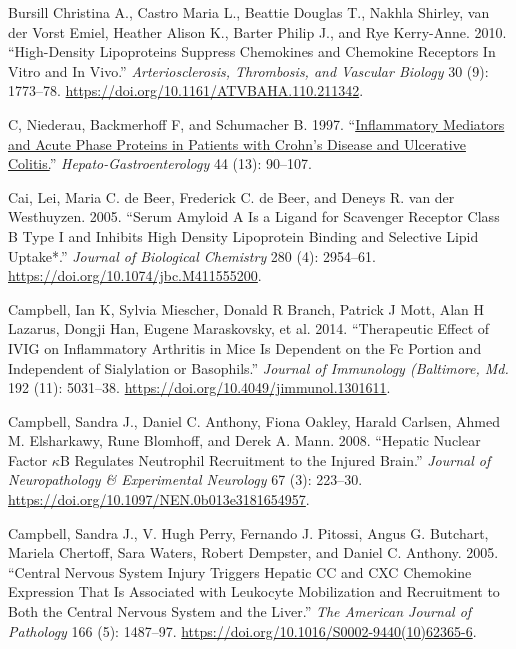 \documentclass[9pt,lineno]{elife}
\newlength{\cslhangindent}
\newlength{\cslentryspacingunit} %
\newenvironment{CSLReferences}[2] %
 {%
  \setlength{\parindent}{0pt}
  \ifodd #1
  \let\oldpar\par
  \def\par{\hangindent=\cslhangindent\oldpar}
  \fi
  \setlength{\parskip}{#2\cslentryspacingunit}
 }%
 {}
\begin{document}
\begin{CSLReferences}{1}{0}
\leavevmode{}%
Bursill Christina A., Castro Maria L., Beattie Douglas T., Nakhla Shirley, van der Vorst Emiel, Heather Alison K., Barter Philip J., and Rye Kerry-Anne. 2010. {``High-{Density Lipoproteins Suppress Chemokines} and {Chemokine Receptors In Vitro} and {In Vivo}.''} \emph{Arteriosclerosis, Thrombosis, and Vascular Biology} 30 (9): 1773--78. \url{https://doi.org/10.1161/ATVBAHA.110.211342}.

\leavevmode{}%
C, Niederau, Backmerhoff F, and Schumacher B. 1997. {``\href{https://www.ncbi.nlm.nih.gov/pubmed/9058126}{Inflammatory Mediators and Acute Phase Proteins in Patients with {Crohn}'s Disease and Ulcerative Colitis.}''} \emph{Hepato-Gastroenterology} 44 (13): 90--107.

\leavevmode{}%
Cai, Lei, Maria C. de Beer, Frederick C. de Beer, and Deneys R. van der Westhuyzen. 2005. {``Serum {Amyloid A Is} a {Ligand} for {Scavenger Receptor Class B Type I} and {Inhibits High Density Lipoprotein Binding} and {Selective Lipid Uptake}*.''} \emph{Journal of Biological Chemistry} 280 (4): 2954--61. \url{https://doi.org/10.1074/jbc.M411555200}.

\leavevmode{}%
Campbell, Ian K, Sylvia Miescher, Donald R Branch, Patrick J Mott, Alan H Lazarus, Dongji Han, Eugene Maraskovsky, et al. 2014. {``Therapeutic Effect of {IVIG} on Inflammatory Arthritis in Mice Is Dependent on the {Fc} Portion and Independent of Sialylation or Basophils.''} \emph{Journal of Immunology (Baltimore, Md.} 192 (11): 5031--38. \url{https://doi.org/10.4049/jimmunol.1301611}.

\leavevmode{}%
Campbell, Sandra J., Daniel C. Anthony, Fiona Oakley, Harald Carlsen, Ahmed M. Elsharkawy, Rune Blomhoff, and Derek A. Mann. 2008. {``Hepatic {Nuclear Factor \(\kappa\)B Regulates Neutrophil Recruitment} to the {Injured Brain}.''} \emph{Journal of Neuropathology \& Experimental Neurology} 67 (3): 223--30. \url{https://doi.org/10.1097/NEN.0b013e3181654957}.

\leavevmode{}%
Campbell, Sandra J., V. Hugh Perry, Fernando J. Pitossi, Angus G. Butchart, Mariela Chertoff, Sara Waters, Robert Dempster, and Daniel C. Anthony. 2005. {``Central {Nervous System Injury Triggers Hepatic CC} and {CXC Chemokine Expression} That {Is Associated} with {Leukocyte Mobilization} and {Recruitment} to {Both} the {Central Nervous System} and the {Liver}.''} \emph{The American Journal of Pathology} 166 (5): 1487--97. \url{https://doi.org/10.1016/S0002-9440(10)62365-6}.


\end{CSLReferences}
\end{document}
